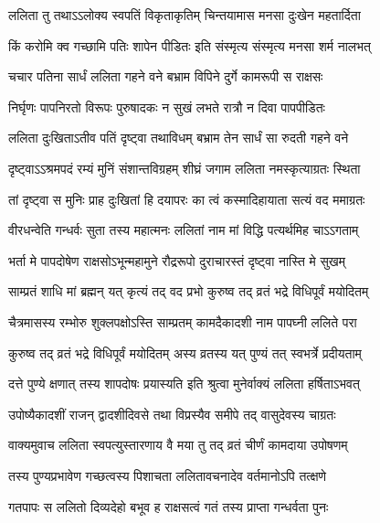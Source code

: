 \twolineshloka
{ललिता तु तथाऽऽलोक्य स्वपतिं विकृताकृतिम्}
{चिन्तयामास मनसा दुःखेन महतार्दिता}%

\twolineshloka
{किं करोमि क्व गच्छामि पतिः शापेन पीडितः}
{इति संस्मृत्य संस्मृत्य मनसा शर्म नालभत्}%

\twolineshloka
{चचार पतिना सार्धं ललिता गहने वने}
{बभ्राम विपिने दुर्गे कामरूपी स राक्षसः}%

\twolineshloka
{निर्घृणः पापनिरतो विरूपः पुरुषादकः}
{न सुखं लभते रात्रौ न दिवा पापपीडितः}%

\twolineshloka
{ललिता दुःखिताऽतीव पतिं दृष्ट्वा तथाविधम्}
{बभ्राम तेन सार्धं सा रुदती गहने वने}%

\twolineshloka
{दृष्ट्वाऽऽश्रमपदं रम्यं मुनिं संशान्तविग्रहम्}
{शीघ्रं जगाम ललिता नमस्कृत्याग्रतः स्थिता}%

\twolineshloka
{तां दृष्ट्वा स मुनिः प्राह दुःखितां हि दयापरः}
{का त्वं कस्मादिहायाता सत्यं वद ममाग्रतः}%


\twolineshloka
{वीरधन्वेति गन्धर्वः सुता तस्य महात्मनः}
{ललितां नाम मां विद्धि पत्यर्थमिह चाऽऽगताम्}%

\twolineshloka
{भर्ता मे पापदोषेण राक्षसोऽभून्महामुने}
{रौद्ररूपो दुराचारस्तं दृष्ट्वा नास्ति मे सुखम्}%

\twolineshloka
{साम्प्रतं शाधि मां ब्रह्मन् यत् कृत्यं तद् वद प्रभो}
{कुरुष्व तद् व्रतं भद्रे विधिपूर्वं मयोदितम्}%


\twolineshloka
{चैत्रमासस्य रम्भोरु शुक्लपक्षोऽस्ति साम्प्रतम्}
{कामदैकादशी नाम पापघ्नी ललिते परा}%

\twolineshloka
{कुरुष्व तद् व्रतं भद्रे विधिपूर्वं मयोदितम्}
{अस्य व्रतस्य यत् पुण्यं तत् स्वभर्त्रे प्रदीयताम्}%

\twolineshloka
{दत्ते पुण्ये क्षणात् तस्य शापदोषः प्रयास्यति}
{इति श्रुत्वा मुनेर्वाक्यं ललिता हर्षिताऽभवत्}%

\twolineshloka
{उपोष्यैकादशीं राजन् द्वादशीदिवसे तथा}
{विप्रस्यैव समीपे तद् वासुदेवस्य चाग्रतः}%

\twolineshloka
{वाक्यमुवाच ललिता स्वपत्युस्तारणाय वै}
{मया तु तद् व्रतं चीर्णं कामदाया उपोषणम्}%

\twolineshloka
{तस्य पुण्यप्रभावेण गच्छत्वस्य पिशाचता}
{ललितावचनादेव वर्तमानोऽपि तत्क्षणे}%

\twolineshloka
{गतपापः स ललितो दिव्यदेहो बभूव ह}
{राक्षसत्वं गतं तस्य प्राप्ता गन्धर्वता पुनः}%

